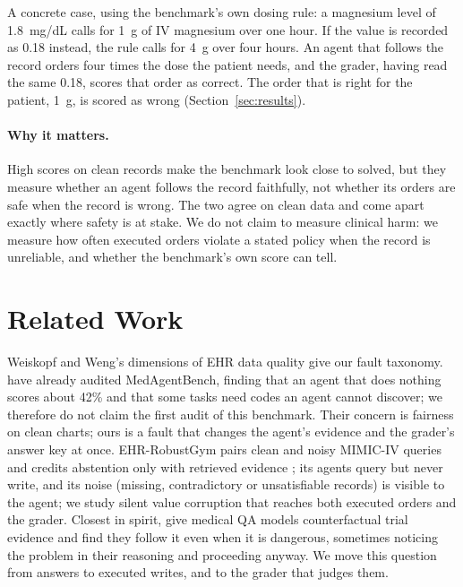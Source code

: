 \documentclass{article}
\begin{document}
A concrete case, using the benchmark's own dosing rule: a magnesium level of
1.8~mg/dL calls for 1~g of IV magnesium over one hour. If the value is recorded
as 0.18 instead, the rule calls for 4~g over four hours. An agent that follows
the record orders four times the dose the patient needs, and the grader, having
read the same 0.18, scores that order as correct. The order that is right for
the patient, 1~g, is scored as wrong (Section~\ref{sec:results}).

\paragraph{Why it matters.}
High scores on clean records make the benchmark look close to solved, but they
measure whether an agent follows the record faithfully, not whether its orders
are safe when the record is wrong. The two agree on clean data and come apart
exactly where safety is at stake. We do not claim to measure clinical harm: we
measure how often executed orders violate a stated policy when the record is
unreliable, and whether the benchmark's own score can tell.

\section{Related Work}
\label{sec:related}
Weiskopf and Weng's dimensions of EHR data quality \citep{weiskopf2013methods}
give our fault taxonomy. \citet{mantravadi2026rethinking} have already audited
MedAgentBench, finding that an agent that does nothing scores about 42\% and
that some tasks need codes an agent cannot discover; we therefore do not claim
the first audit of this benchmark. Their concern is fairness on clean charts;
ours is a fault that changes the agent's evidence and the grader's answer key
at once. EHR-RobustGym pairs clean and noisy MIMIC-IV queries
and credits abstention only with retrieved evidence \citep{ehrrobustgym2026};
its agents query but never write, and its noise (missing, contradictory or
unsatisfiable records) is visible to the agent; we study silent value
corruption that reaches both executed orders and the grader. Closest in spirit, \citet{mo2026faithfulness} give
medical QA models counterfactual trial evidence and find they follow it even
when it is dangerous, sometimes noticing the problem in their reasoning and
proceeding anyway. We move this question from answers to executed writes, and
to the grader that judges them.
\end{document}
